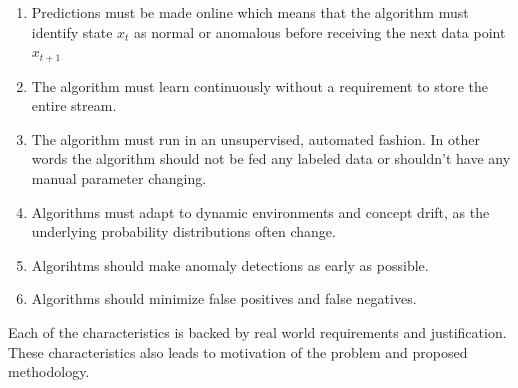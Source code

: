 \documentclass[12pt]{article}
\begin{document}
\begin{enumerate}
\item Predictions must be made online which means that the algorithm must identify state $x_t$ as normal or anomalous before receiving the next data point $x_{t+1}$
\item The algorithm must learn continuously without a requirement to store the entire stream. 
\item The algorithm must run in an unsupervised, automated fashion. In other words the algorithm should not be fed any labeled data or shouldn't have any manual parameter changing.
\item Algorithms must adapt to dynamic environments and concept drift, as the underlying probability distributions often change.
\item Algorihtms should make anomaly detections as early as possible.
\item Algorithms should minimize false positives and false negatives.
\end{enumerate}

Each of the characteristics is backed by real world requirements and justification. These characteristics also leads to motivation of the problem and proposed methodology.
\end{document}
